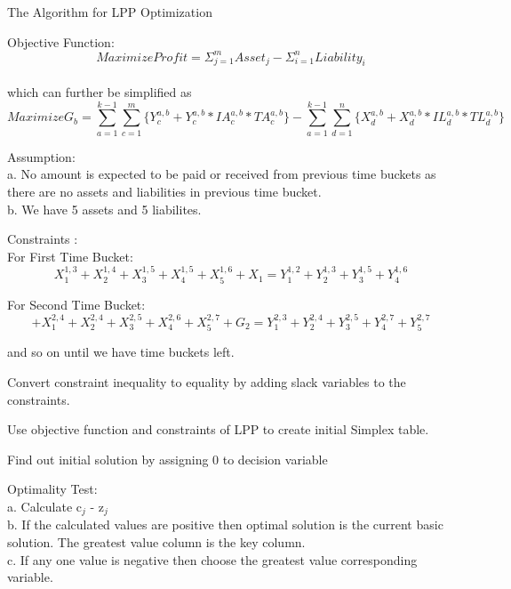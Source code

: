\begin{algorithm}[H]

\caption{The Algorithm for LPP Optimization}

\begin{algorithmic}[1] 
						
\STATE Objective Function: \begin{equation}Maximize  Profit =  \Sigma_{j=1}^{m} Asset_{j} -  \Sigma_{i=1}^{n} Liability_{i}\end{equation}\\
		which can further be simplified as\\
		\begin{equation}Maximize  G_{b} =  \sum_{a=1}^{k-1} \sum_{c=1}^{m} \{ Y_{c}^{a,b} + Y_{c}^{a,b} * IA_{c}^{a,b} * TA_{c}^{a,b} \} -  \sum_{a=1}^{k-1} \sum_{d=1}^{n} \{ X_{d}^{a,b} + X_{d}^{a,b} * IL_{d}^{a,b} * TL_{d}^{a,b}\} \end{equation}

\STATE Assumption: \\a. No amount is expected to be paid or received from previous time buckets as there are no assets and liabilities in previous time bucket.\\
b. We have 5 assets and 5 liabilites.
	
\STATE Constraints : \\

For First Time Bucket: 
\begin{equation} X_{1}^{1,3} + X_{2}^{1,4} + X_{3}^{1,5} +X_{4}^{1,5} + X_{5}^{1,6} + X_{1}= Y_{1}^{1,2} + Y_{2}^{1,3} +Y_{3}^{1,5} + Y_{4}^{1,6}\end{equation}

For Second Time Bucket:
\begin{equation}
[Y_{1}^{1,2} + Y_{1}^{1,2}* IA_{1}^{1,2} * TA_{1}^{1,2}] +  X_{1}^{2,4} + X_{2}^{2,4} + X_{3}^{2,5} + X_{4}^{2,6} + X_{5}^{2,7} + G_{2} = Y_{1}^{2,3} + Y_{2}^{2,4} +  Y_{3}^{2,5} +  Y_{4}^{2,7} +  Y_{5}^{2,7} 
\end{equation}

and so on until we have time buckets left.

\STATE Convert constraint inequality to equality by adding slack variables to the constraints.

\STATE Use objective function and constraints of LPP to create initial Simplex table.

\STATE Find out initial solution by assigning 0 to decision variable

\STATE Optimality Test: \\ 
\tab a. Calculate	c$_{j}$ - z$_{j}$  \\ 
\tab b. If the calculated values are positive then optimal solution is the current basic solution. The greatest value column is the key column.\\ 
\tab c. If any one value is negative then choose the greatest value corresponding variable.


\end{algorithmic}
\end{algorithm}
